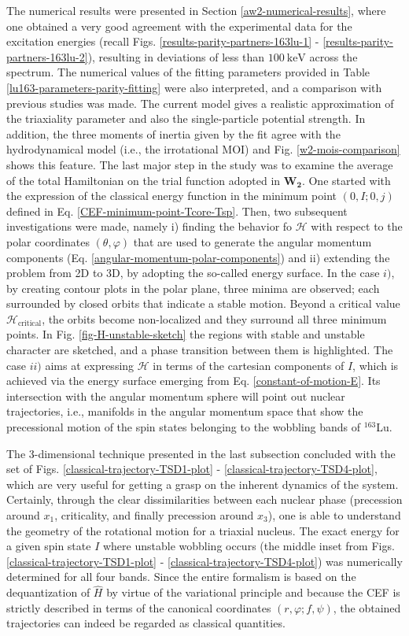 The numerical results were presented in Section \ref{aw2-numerical-results}, where one obtained a very good agreement with the experimental data for the excitation energies (recall Figs. \ref{results-parity-partners-163lu-1} - \ref{results-parity-partners-163lu-2}), resulting in deviations of less than $100\ \text{keV}$ across the spectrum. The numerical values of the fitting parameters provided in Table \ref{lu163-parameters-parity-fitting} were also interpreted, and a comparison with previous studies was made. The current model gives a realistic approximation of the triaxiality parameter and also the single-particle potential strength. In addition, the three moments of inertia given by the fit agree with the hydrodynamical model (i.e., the irrotational MOI) and Fig. \ref{w2-mois-comparison} shows this feature. The last major step in the study was to examine the average of the total Hamiltonian on the trial function adopted in $\mathbf{W_2}$. One started with the expression of the classical energy function in the minimum point $(0,I;0,j)$ defined in Eq. \ref{CEF-minimum-point-Tcore-Tsp}. Then, two subsequent investigations were made, namely i) finding the behavior fo $\mathcal{H}$ with respect to the polar coordinates $(\theta,\varphi)$ that are used to generate the angular momentum components (Eq. \ref{angular-momentum-polar-components}) and ii) extending the problem from 2D to 3D, by adopting the so-called energy surface. In the case $i)$, by creating contour plots in the polar plane, three minima are observed; each surrounded by closed orbits that indicate a stable motion. Beyond a critical value $\mathcal{H}_\text{critical}$, the orbits become non-localized and they surround all three minimum points. In Fig. \ref{fig-H-unstable-sketch} the regions with stable and unstable character are sketched, and a phase transition between them is highlighted. The case $ii)$ aims at expressing $\mathcal{H}$ in terms of the cartesian components of $I$, which is achieved via the energy surface emerging from Eq. \ref{constant-of-motion-E}. Its intersection with the angular momentum sphere will point out nuclear trajectories, i.e., manifolds in the angular momentum space that show the precessional motion of the spin states belonging to the wobbling bands of $^{163}$Lu.

The 3-dimensional technique presented in the last subsection concluded with the set of Figs. \ref{classical-trajectory-TSD1-plot} - \ref{classical-trajectory-TSD4-plot}, which are very useful for getting a grasp on the inherent dynamics of the system. Certainly, through the clear dissimilarities between each nuclear phase (precession around $x_1$, criticality, and finally precession around $x_3$), one is able to understand the geometry of the rotational motion for a triaxial nucleus. The exact energy for a given spin state $I$ where unstable wobbling occurs (the middle inset from Figs. \ref{classical-trajectory-TSD1-plot} - \ref{classical-trajectory-TSD4-plot}) was numerically determined for all four bands. Since the entire formalism is based on the dequantization of $\hat{H}$ by virtue of the variational principle and because the CEF is strictly described in terms of the canonical coordinates $(r,\varphi;f,\psi)$, the obtained trajectories can indeed be regarded as classical quantities.